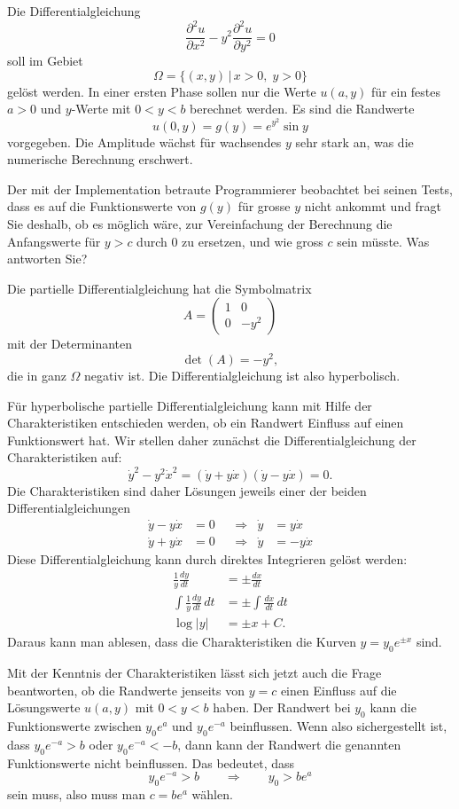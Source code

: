 Die Differentialgleichung
\[
\frac{\partial^2 u}{\partial x^2}-y^2\frac{\partial^2u}{\partial y^2}=0
\]
soll im Gebiet
\[
\Omega=\{(x,y)\,|\,x>0,\;y>0\}
\]
gelöst werden.
In einer ersten Phase sollen nur die Werte $u(a,y)$ für ein festes 
$a > 0$ und $y$-Werte mit $0<y<b$ berechnet werden.
Es sind die Randwerte
\[
u(0,y)=g(y)=e^{y^2}\sin y
\]
vorgegeben. Die Amplitude wächst für wachsendes $y$ sehr stark an,
was die numerische Berechnung erschwert.

Der mit der Implementation betraute Programmierer beobachtet bei seinen
Tests, dass es auf die Funktionswerte von $g(y)$ für grosse
$y$ nicht ankommt und fragt Sie deshalb, ob es möglich wäre, zur
Vereinfachung der Berechnung die Anfangswerte für $y>c$ durch
$0$ zu ersetzen, und wie gross $c$ sein müsste. Was antworten Sie?

\begin{loesung}
Die partielle Differentialgleichung hat die Symbolmatrix
\[
A=
\begin{pmatrix}
1&0\\0&-y^2
\end{pmatrix}
\]
mit der Determinanten
\[
\det(A)=-y^2,
\]
die in ganz $\Omega$ negativ ist.
Die Differentialgleichung ist also hyperbolisch.

Für hyperbolische partielle Differentialgleichung kann mit Hilfe der
Charakteristiken ent\-schie\-den werden, ob ein Randwert Einfluss auf einen
Funktionswert hat. Wir stellen daher zunächst die Differentialgleichung
der Charakteristiken auf:
\[
\dot y^2-y^2\dot x^2=(\dot y+y\dot x)(\dot y-y\dot x)=0.
\]
Die Charakteristiken sind daher Lösungen jeweils einer der beiden
Differentialgleichungen
\begin{align*}
\dot y-y\dot x&=0&&\Rightarrow&\dot y&=y\dot x\\
\dot y+y\dot x&=0&&\Rightarrow&\dot y&=-y\dot x
\end{align*}
Diese Differentialgleichung kann durch direktes Integrieren
gelöst werden:
\begin{align*}
\frac1y\frac{dy}{dt}&=\pm\frac{dx}{dt}\\
\int \frac1y\frac{dy}{dt}\,dt&=\pm\int \frac{dx}{dt}\,dt\\
\log |y|&= \pm x + C.
\end{align*}
Daraus kann man ablesen, dass die Charakteristiken die Kurven 
$y=y_0e^{\pm x}$ sind.

Mit der Kenntnis der Charakteristiken lässt sich jetzt auch die 
Frage beantworten, ob die Randwerte jenseits von $y=c$ einen Einfluss
auf die Lösungswerte $u(a,y)$ mit $0<y<b$ haben. Der Randwert
bei $y_0$ kann die Funktionswerte zwischen $y_0e^a$ und $y_0e^{-a}$
beinflussen. Wenn also sichergestellt ist, dass $y_0e^{-a} > b$
oder $y_0e^{-a} < -b$, dann kann der Randwert die genannten Funktionswerte
nicht beinflussen. Das bedeutet, dass 
\[
y_0e^{-a}>b
\qquad\Rightarrow\qquad
y_0>be^a
\]
sein muss, also muss man $c=be^a$ wählen.
\end{loesung}

